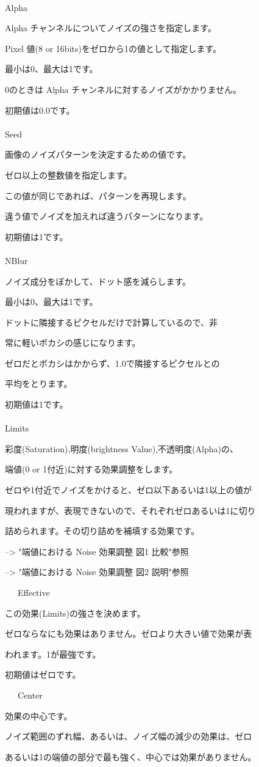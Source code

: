 \documentclass[a4paper,12pt]{article}
\begin{document}
\newpage

\thispagestyle{empty}

\ \vspace{-0.2em}
\par
\noindent Alpha\par
Alpha チャンネルについてノイズの強さを指定します。\par
Pixel 値(8 or 16bits)をゼロから1の値として指定します。\par
最小は0、最大は1です。\par
0のときは Alpha チャンネルに対するノイズがかかりません。\par
初期値は0.0です。\\
\\
Seed\par
画像のノイズパターンを決定するための値です。\par
ゼロ以上の整数値を指定します。\par
この値が同じであれば、パターンを再現します。\par
違う値でノイズを加えれば違うパターンになります。\par
初期値は1です。\\
\\
NBlur\par
ノイズ成分をぼかして、ドット感を減らします。\par
最小は0、最大は1です。\par
ドットに隣接するピクセルだけで計算しているので、非\par
常に軽いボカシの感じになります。\par
ゼロだとボカシはかからず、1.0で隣接するピクセルとの\par
平均をとります。\par
初期値は1です。\\
\\
Limits\par
彩度(Saturation),明度(brightness Value),不透明度(Alpha)の、\par
端値(0 or 1付近)に対する効果調整をします。\par
ゼロや1付近でノイズをかけると、ゼロ以下あるいは1以上の値が\par
現われますが、表現できないので、それぞれゼロあるいは1に切り\par
詰められます。その切り詰めを補填する効果です。\par
--> "端値における Noise 効果調整 図1 比較"参照\par
--> "端値における Noise 効果調整 図2 説明"参照\\
\par
\noindent \ \ \, Effective\par
この効果(Limits)の強さを決めます。\par
ゼロならなにも効果はありません。ゼロより大きい値で効果が表\par
われます。1が最強です。\par
初期値はゼロです。\\
\par
\noindent \ \ \, Center\par
効果の中心です。\par
ノイズ範囲のずれ幅、あるいは、ノイズ幅の減少の効果は、ゼロ\par
あるいは1の端値の部分で最も強く、中心では効果がありません。
\end{document}
